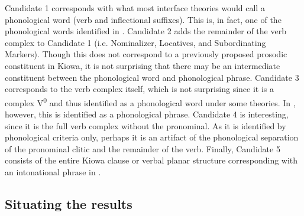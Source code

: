 \documentclass[output=paper]{langscibook}
\begin{document}
\begin{table}
\caption{\label{extab:04:candidates}  Wordhood candidates in Kiowa }
\end{table}

Candidate 1 corresponds with what most interface theories would call a phonological word (verb and inflectional suffixes). This is, in fact, one of the phonological words identified in \citet{Miller:2015,Miller:2018,Miller:2020}. Candidate 2 adds the remainder of the verb complex to Candidate 1 (i.e. Nominalizer, Locatives, and Subordinating Markers). Though this does not correspond to a previously proposed prosodic constituent in Kiowa, it is not surprising that there may be an intermediate constituent between the phonological word and phonological phrase.  Candidate 3 corresponds to the verb complex itself, which is not surprising since it is a complex V\textsuperscript{0} and thus identified as a phonological word under some theories. In \citet{Miller:2018,Miller:2020}, however, this is identified as a phonological phrase.  Candidate 4 is interesting, since it is the full verb complex without the pronominal. As it is identified by phonological criteria only, perhaps it is an artifact of the phonological separation of the pronominal clitic and the remainder of the verb. Finally, Candidate 5 consists of the entire Kiowa clause or verbal planar structure corresponding with an intonational phrase in \citet{Miller:2018,Miller:2020}.

\subsection{Situating the results}
\end{document}
